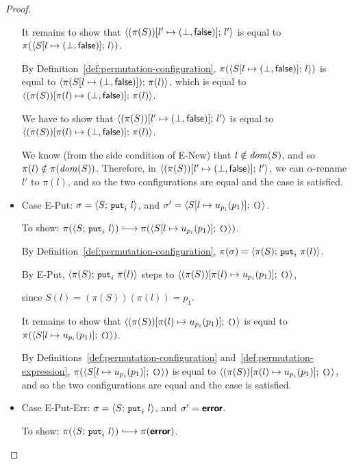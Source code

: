 \begin{proof}
\begin{itemize}
      It remains to show that
      $\langle (\pi(S))[l' \mapsto (\bot, \textsf{false})];\, l' \rangle$ is equal
      to $\pi(\langle S[l \mapsto (\bot, \textsf{false})];\, l \rangle)$.

      By Definition~\ref{def:permutation-configuration},
      $\pi(\langle S[l \mapsto (\bot, \textsf{false})];\, l \rangle)$ is equal to
      $\langle \pi(S[l \mapsto (\bot, \textsf{false})]);\, \pi(l) \rangle$, which
      is equal to
      $\langle (\pi(S))[\pi(l) \mapsto (\bot, \textsf{false})];\, \pi(l) \rangle$.

      We have to show that
      $\langle (\pi(S))[l' \mapsto (\bot, \textsf{false})];\, l' \rangle$ is equal
      to
      $\langle (\pi(S))[\pi(l) \mapsto (\bot, \textsf{false})];\, \pi(l) \rangle$.

      We know (from the side condition of {\sc E-New}) that $l
      \notin \mathit{dom}(S)$, and so $\pi(l) \notin \pi(\mathit{dom}(S))$.
      Therefore, in
      $\langle (\pi(S))[l' \mapsto (\bot, \textsf{false})];\, l' \rangle$, we can
      $\alpha$-rename $l'$ to $\pi(l)$, and so the two configurations
      are equal and the case is satisfied.

    \item Case {\sc E-Put}: $\sigma = \langle S;\, \mbox{\small{\texttt{put}}}_i~l \rangle$, and
      $\sigma' = \langle S[l \mapsto u_{p_i}(p_1)];\, \mbox{\small{\texttt{()}}} \rangle$.

      To show: $\pi(\config{S}{\putiexp{l}}) \parstepsto
      \pi(\config{\extSRaw{S}{l}{u_{p_i}(p_1)}}{\unit})$.

      By Definition~\ref{def:permutation-configuration}, $\pi(\sigma) =
      \langle \pi(S);\, \mbox{\small{\texttt{put}}}_i~\pi(l) \rangle$.

      By {\sc E-Put}, $\langle \pi(S);\, \mbox{\small{\texttt{put}}}_i~\pi(l) \rangle$ steps to
      $\langle (\pi(S))[\pi(l) \mapsto u_{p_i}(p_1)];\, \mbox{\small{\texttt{()}}} \rangle$,

      since $S(l) = (\pi(S))(\pi(l)) = p_1$.

      It remains to show that
      $\langle (\pi(S))[\pi(l) \mapsto u_{p_i}(p_1)];\, \mbox{\small{\texttt{()}}} \rangle$ is
      equal to $\pi(\langle S[l \mapsto u_{p_i}(p_1)];\, \mbox{\small{\texttt{()}}} \rangle)$.

      By Definitions~\ref{def:permutation-configuration}
      and~\ref{def:permutation-expression},
      $\pi(\langle S[l \mapsto u_{p_i}(p_1)];\, \mbox{\small{\texttt{()}}} \rangle)$ is equal to
      $\langle (\pi(S))[\pi(l) \mapsto u_{p_i}(p_1)];\, \mbox{\small{\texttt{()}}} \rangle$, and
      so the two configurations are equal and the case is satisfied.
    \item Case {\sc E-Put-Err}: $\sigma = \langle S;\, \mbox{\small{\texttt{put}}}_i~l \rangle$,
      and $\sigma' = \textbf{\textsf{error}}$.

      To show: $\pi(\config{S}{\putiexp{l}}) \parstepsto
      \pi(\error)$.


\end{itemize}
\end{proof}
